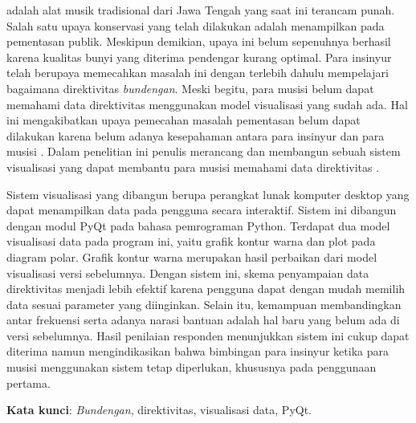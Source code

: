 \Bundengan adalah alat musik tradisional dari Jawa Tengah yang saat ini terancam punah. Salah satu upaya konservasi yang telah dilakukan adalah menampilkan \bundengan pada pementasan publik. Meskipun demikian, upaya ini belum sepenuhnya berhasil karena kualitas bunyi \bundengan yang diterima pendengar kurang optimal. Para insinyur telah berupaya memecahkan masalah ini dengan terlebih dahulu mempelajari bagaimana direktivitas \emph{bundengan}. Meski begitu, para musisi \bundengan belum dapat memahami data direktivitas menggunakan model visualisasi yang sudah ada. Hal ini mengakibatkan upaya pemecahan masalah pementasan \bundengan belum dapat dilakukan karena belum adanya kesepahaman antara para insinyur dan para musisi \bundengan. Dalam penelitian ini penulis merancang dan membangun sebuah sistem visualisasi yang dapat membantu para musisi memahami data direktivitas \bundengan. \par 

Sistem visualisasi yang dibangun berupa perangkat lunak komputer desktop yang dapat menampilkan data pada pengguna secara interaktif. Sistem ini dibangun dengan modul PyQt pada bahasa pemrograman Python. Terdapat dua model visualisasi data pada program ini, yaitu grafik kontur warna dan plot pada diagram polar. Grafik kontur warna merupakan hasil perbaikan dari model visualisasi versi sebelumnya. Dengan sistem ini, skema penyampaian data direktivitas menjadi lebih efektif karena pengguna dapat dengan mudah memilih data sesuai parameter yang diinginkan. Selain itu, kemampuan membandingkan antar frekuensi serta adanya narasi bantuan adalah hal baru yang belum ada di versi sebelumnya. Hasil penilaian responden menunjukkan sistem ini cukup dapat diterima namun mengindikasikan bahwa bimbingan para insinyur ketika para musisi menggunakan sistem tetap diperlukan, khususnya pada penggunaan pertama. \par 

\vspace{0.5cm}
\hspace{-1.2cm}
\textbf{Kata kunci}: \textit{Bundengan}, direktivitas, visualisasi data, PyQt.


